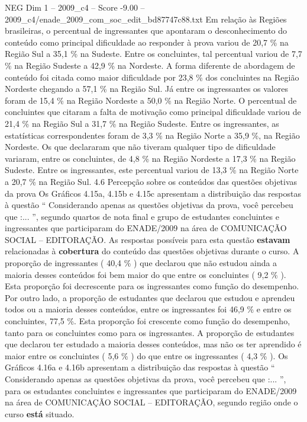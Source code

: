 \begin{textsample}{NEG Dim 1 – 2009\_c4 – Score -9.00 – 2009\_c4/enade\_2009\_com\_soc\_edit\_bd87747c88.txt}
Em relação às Regiões brasileiras, o percentual de ingressantes que apontaram o desconhecimento do conteúdo como principal dificuldade ao responder à prova variou de 20,7 \% na Região Sul a 35,1 \% na Sudeste.
Entre os concluintes, tal percentual variou de 7,7 \% na Região Sudeste a 42,9 \% na Nordeste.
A forma diferente de abordagem de conteúdo foi citada como maior dificuldade por 23,8 \% dos concluintes na Região Nordeste chegando a 57,1 \% na Região Sul.
Já entre os ingressantes os valores foram de 15,4 \% na Região Nordeste a 50,0 \% na Região Norte.
O percentual de concluintes que citaram a falta de motivação como principal dificuldade variou de 21,4 \% na Região Sul a 31,7 \% na Região Sudeste.
Entre os ingressantes, as estatísticas correspondentes foram de 3,3 \% na Região Norte a 35,9 \%, na Região Nordeste.
Os que declararam que não tiveram qualquer tipo de dificuldade variaram, entre os concluintes, de 4,8 \% na Região Nordeste a 17,3 \% na Região Sudeste.
Entre os ingressantes, este percentual variou de 13,3 \% na Região Norte a 20,7 \% na Região Sul. 4.6 Percepção sobre os conteúdos das questões objetivas da prova Os Gráficos 4.15a, 4.15b e 4.15c apresentam a distribuição das respostas à questão “ Considerando apenas as questões objetivas da prova, você percebeu que :... ”, segundo quartos de nota final e grupo de estudantes concluintes e ingressantes que participaram do ENADE/2009 na área de COMUNICAÇÃO SOCIAL – EDITORAÇÃO.
As respostas possíveis para esta questão \textbf{estavam} relacionadas à \textbf{cobertura} do conteúdo das questões objetivas durante o curso.
A proporção de ingressantes ( 40,4 \% ) que declarou que não estudou ainda a maioria desses conteúdos foi bem maior do que entre os concluintes ( 9,2 \% ).
Esta proporção foi decrescente para os ingressantes como função do desempenho.
Por outro lado, a proporção de estudantes que declarou que estudou e aprendeu todos ou a maioria desses conteúdos, entre os ingressantes foi 46,9 \% e entre os concluintes, 77,5 \%.
Esta proporção foi crescente como função do desempenho, tanto para os concluintes como para os ingressantes.
A proporção de estudantes que declarou ter estudado a maioria desses conteúdos, mas não os ter aprendido é maior entre os concluintes ( 5,6 \% ) do que entre os ingressantes ( 4,3 \% ).
Os Gráficos 4.16a e 4.16b apresentam a distribuição das respostas à questão “ Considerando apenas as questões objetivas da prova, você percebeu que :... ”, para os estudantes concluintes e ingressantes que participaram do ENADE/2009 na área de COMUNICAÇÃO SOCIAL – EDITORAÇÃO, segundo região onde o curso \textbf{está} situado.

\end{textsample}
